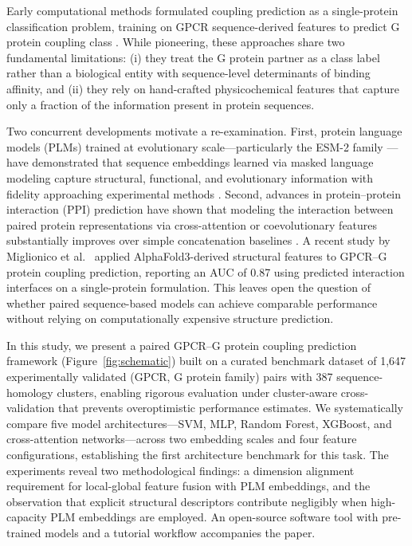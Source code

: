 \documentclass[11pt,a4paper]{article}
\begin{document}
Early computational methods formulated coupling prediction as a single-protein classification problem, training on GPCR sequence-derived features to predict G protein coupling class \cite{roller2001prediction, ono2006prediction, sgourakis2005method, yabuki2005gprotein}. While pioneering, these approaches share two fundamental limitations: (i) they treat the G protein partner as a class label rather than a biological entity with sequence-level determinants of binding affinity, and (ii) they rely on hand-crafted physicochemical features that capture only a fraction of the information present in protein sequences.

Two concurrent developments motivate a re-examination. First, protein language models (PLMs) trained at evolutionary scale---particularly the ESM-2 family \cite{lin2023evolutionary}---have demonstrated that sequence embeddings learned via masked language modeling capture structural, functional, and evolutionary information with fidelity approaching experimental methods \cite{rives2021biological, elnaggar2021prottrans}. Second, advances in protein--protein interaction (PPI) prediction have shown that modeling the interaction between paired protein representations via cross-attention \cite{vaswani2017attention} or coevolutionary features \cite{cong2019protein} substantially improves over simple concatenation baselines \cite{sledzieski2021dscript, hashemifar2018predicting, chen2019transform}. A recent study by Miglionico et al.\ \cite{miglionico2025predicting} applied AlphaFold3-derived structural features to GPCR--G protein coupling prediction, reporting an AUC of 0.87 using predicted interaction interfaces on a single-protein formulation. This leaves open the question of whether paired sequence-based models can achieve comparable performance without relying on computationally expensive structure prediction.

In this study, we present a paired GPCR--G protein coupling prediction framework (Figure~\ref{fig:schematic}) built on a curated benchmark dataset of 1,647 experimentally validated (GPCR, G protein family) pairs with 387 sequence-homology clusters, enabling rigorous evaluation under cluster-aware cross-validation that prevents overoptimistic performance estimates. We systematically compare five model architectures---SVM, MLP, Random Forest, XGBoost, and cross-attention networks---across two embedding scales and four feature configurations, establishing the first architecture benchmark for this task. The experiments reveal two methodological findings: a dimension alignment requirement for local-global feature fusion with PLM embeddings, and the observation that explicit structural descriptors contribute negligibly when high-capacity PLM embeddings are employed. An open-source software tool with pre-trained models and a tutorial workflow accompanies the paper.
\end{document}
